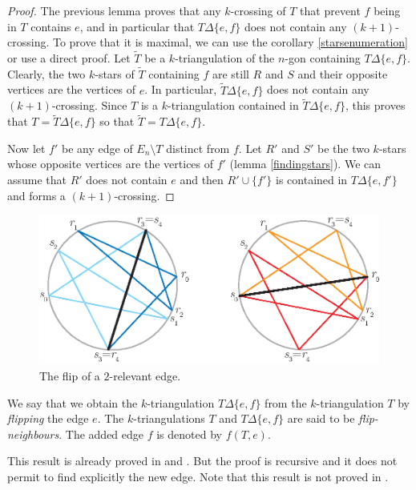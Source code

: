 \documentclass[12pt]{amsart}
\begin{document}
\begin{proof}
The previous lemma proves that any $k$-crossing of $T$ that prevent $f$ being in $T$ contains $e$, and in particular that $T\Delta\{e,f\}$ does not contain any $(k+1)$-crossing. To prove that it is maximal, we can use the corollary \ref{starsenumeration} or use a direct proof. Let $\tilde{T}$ be a $k$-triangulation of the $n$-gon containing $T\Delta\{e,f\}$. Clearly, the two $k$-stars of $\tilde{T}$ containing $f$ are still $R$ and $S$ and their opposite vertices are the vertices of $e$. In particular, $\tilde{T}\Delta\{e,f\}$ does not contain any $(k+1)$-crossing. Since $T$ is a $k$-triangulation contained in $\tilde{T}\Delta\{e,f\}$, this proves that $T=\tilde{T}\Delta\{e,f\}$ so that $\tilde{T}=T\Delta\{e,f\}$.

Now let $f'$ be any edge of $E_n\setminus T$ distinct from $f$. Let $R'$ and $S'$ be the two $k$-stars whose opposite vertices are the vertices of $f'$ (lemma \ref{findingstars}). We can assume that $R'$ does not contain $e$ and then $R'\cup\{f'\}$ is contained in $T\Delta\{e,f'\}$ and forms a $(k+1)$-crossing.
\end{proof}

\begin{figure}
\centerline{\includegraphics[scale=1]{flip.eps}}
\caption{\small{The flip of a $2$-relevant edge.}}\label{flip}
\end{figure}

We say that we obtain the $k$-triangulation $T\Delta\{e,f\}$ from the $k$-triangulation $T$ by \emph{flipping} the edge $e$. The $k$-triangulations $T$ and $T\Delta\{e,f\}$ are said to be \emph{flip-neighbours}. The added edge $f$ is denoted by $f(T,e)$.

\begin{bibremark}
This result is already proved in \cite{n-gdfcp-00} and \cite{j-gt}. But the proof is recursive and it does not permit to find explicitly the new edge. Note that this result is not proved in \cite{dkm-lahp-02}.

\end{bibremark}
\end{document}
